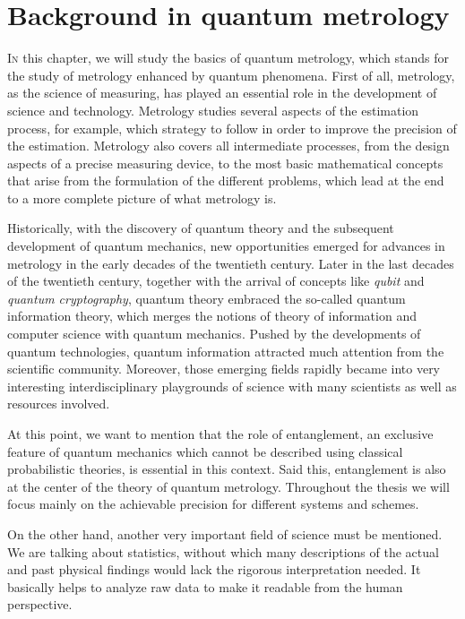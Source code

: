 \section[Backgroud in quantum metrology]
{Background in quantum metrology}



\vspace{0pt}
\lettrine[lines=2, findent=3pt,nindent=0pt]{I}{n} this chapter, we will study the basics of quantum metrology, which stands for the study of metrology enhanced by quantum phenomena.
First of all, metrology, as the science of measuring, has played an essential role in the development of science and technology.
Metrology studies several aspects of the estimation process, for example, which strategy to follow in order to improve the precision of the estimation.
Metrology also covers all intermediate processes, from the design aspects of a precise measuring device, to the most basic mathematical concepts that arise from the formulation of the different problems, which lead at the end to a more complete picture of what metrology is.

Historically, with the discovery of quantum theory and the subsequent development of quantum mechanics, new opportunities emerged for advances in metrology in the early decades of the twentieth century.
Later in the last decades of the twentieth century, together with the arrival of concepts like \emph{qubit} and \emph{quantum cryptography}, quantum theory embraced the so-called quantum information theory, which merges the notions of theory of information and computer science with quantum mechanics.
Pushed by the developments of quantum technologies, quantum information attracted much attention from the scientific community.
Moreover, those emerging fields rapidly became into very interesting interdisciplinary playgrounds of science with many scientists as well as resources involved.

At this point, we want to mention that the role of entanglement, an exclusive feature of quantum mechanics which cannot be described using classical probabilistic theories, is essential in this context.
Said this, entanglement is also at the center of the theory of quantum metrology.
Throughout the thesis we will focus mainly on the achievable precision for different systems and schemes.

On the other hand, another very important field of science must be mentioned.
We are talking about statistics, without which many descriptions of the actual and past physical findings would lack the rigorous interpretation needed.
It basically helps to analyze raw data to make it readable from the human perspective.

